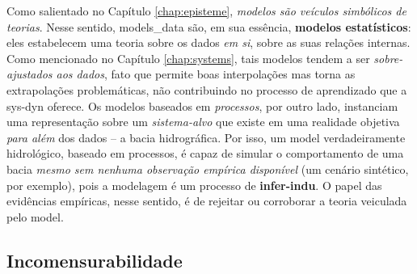 \documentclass[./main.tex]{subfiles}
\begin{document}
\noindent Como salientado no Capítulo \ref{chap:episteme}, \textit{modelos são veículos simbólicos de teorias}. Nesse sentido, \gls{models_data} são, em sua essência, \textbf{modelos estatísticos}: eles estabelecem uma \gls{teoria} sobre os dados \textit{em si}, sobre as suas relações internas. Como mencionado no Capítulo \ref{chap:systems}, tais modelos tendem a ser \textit{sobre-ajustados aos dados}, fato que permite boas interpolações mas torna as extrapolações problemáticas, não contribuindo no processo de aprendizado que a \gls{sys-dyn} oferece. Os modelos baseados em \textit{processos}, por outro lado, instanciam uma representação sobre um \textit{sistema-alvo} que existe em uma realidade objetiva \textit{para além} dos dados -- a bacia hidrográfica. Por isso, um \gls{model} verdadeiramente hidrológico, baseado em processos, é capaz de simular o comportamento de uma bacia \textit{mesmo sem nenhuma observação empírica disponível} (um cenário sintético, por exemplo), pois a modelagem é um processo de \textbf{\gls{infer-indu}}. O papel das evidências empíricas, nesse sentido, é de rejeitar ou corroborar a \gls{teoria} veiculada pelo \gls{model}.

\subsection{Incomensurabilidade} \label{sec:hydro:incomm}
\end{document}
